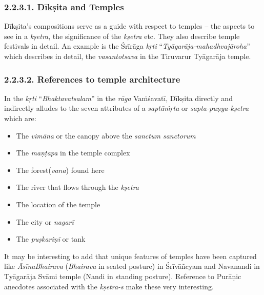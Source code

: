 \subsubsection*{2.2.3.1. Dīkṣita and Temples}

Dīkṣita’s compositions serve as a guide with respect to temples – the aspects to see in a \textit{kṣetra}, the significance of the \textit{kṣetra} etc. They also describe temple festivals in detail. An example is the Śrīrāga\textit{ kṛti} “\textit{Tyāgarāja-mahadhvajāroha}” which describes in detail, the \textit{vasantotsava} in the Tiruvarur Tyāgarāja temple.


\subsubsection*{2.2.3.2. References to temple architecture}

In the \textit{kṛti} “\textit{Bhaktavatsalam}” in the \textit{rāga} Vaṁśavatī, Dīkṣita directly and indirectly alludes to the seven attributes of a \textit{saptāṁṛta} or \textit{sapta-puṇya-kṣetra} which are:

\begin{itemize}
\itemsep=0pt

 \item The \textit{vimāna} or the canopy above the \textit{sanctum sanctorum}

 \item The \textit{maṇṭapa} in the temple complex

 \item The forest(\textit{vana}) found here

 \item The river that flows through the \textit{kṣetra}

 \item The location of the temple

 \item The city or \textit{nagarī}

 \item The \textit{puṣkariṇī} or tank

\end{itemize}

It may be interesting to add that unique features of temples have been captured like \textit{ĀsīnaBhairava} (\textit{Bhairava} in seated posture) in Śrīvāñcyam and Navanandi in Tyāgarāja Svāmi temple (Nandi in standing posture). Reference to Purāṇic anecdotes associated with the \textit{kṣetra-s} make these very interesting.


